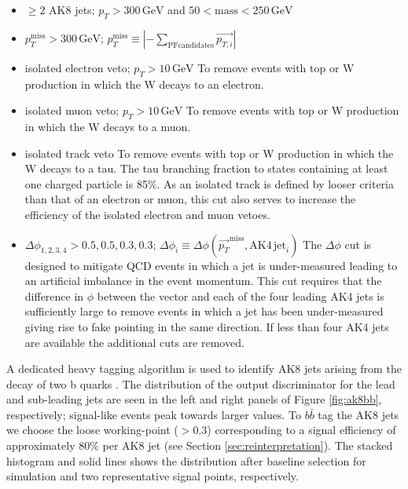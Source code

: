 \begin{itemize}
\item $\geq2$ AK8 jets; $p_{T} > 300\,\mathrm{GeV}$ and $50 < \mathrm{mass} < 250\,\mathrm{GeV}$
\item $p_{T}^{\mathrm{miss}} > 300\,\mathrm{GeV}$; $p_{T}^{\mathrm{miss}} \equiv |-\sum_{\mathrm{PFcandidates}}\vec{p_{T, i}}|$
\item isolated electron veto; $p_{T}>10\,\mathrm{GeV}$\newline
To remove events with top or W production in which the W decays to an electron.
\item isolated muon veto; $p_{T}>10\,\mathrm{GeV}$\newline
To remove events with top or W production in which the W decays to a muon.
\item isolated track veto\newline
To remove events with top or W production in which the W decays to a tau. The tau branching fraction to states containing at least one charged particle is 85\%. As an isolated track is defined by looser criteria than that of an electron or muon, this cut also serves to increase the efficiency of the isolated electron and muon vetoes.

\item $\Delta\phi_{1, 2, 3, 4} > 0.5, 0.5, 0.3, 0.3$; $\Delta\phi_{i}\equiv \Delta\phi(\vec{p_{T}}^{\mathrm{miss}}, \mathrm{AK4\,jet}_{i})$\newline
The $\Delta\phi$ cut is designed to mitigate QCD events in which a jet is under-measured leading to an artificial imbalance in the event momentum. This cut requires that the difference in $\phi$ between the \ptmiss vector and each of the four leading AK4 jets is sufficiently large to remove events in which a jet has been under-measured giving rise to fake \ptmiss pointing in the same direction. If less than four AK4 jets are available the additional cuts are removed.
\end{itemize}

A dedicated heavy tagging algorithm is used to identify AK8 jets arising from the decay of two b quarks \cite{bbtagger}. The distribution of the output discriminator for the lead and sub-leading jets are seen in the left and right panels of Figure \ref{fig:ak8bb}, respectively; signal-like events peak towards larger values. To $b\bar{b}$ tag the AK8 jets we choose the loose working-point ($>$0.3) corresponding to a signal efficiency of approximately $80\%$ per AK8 jet (see Section \ref{sec:reinterpretation}). The stacked histogram and solid lines shows the distribution after baseline selection for simulation and two representative signal points, respectively.


